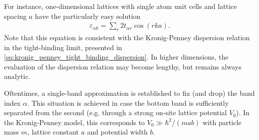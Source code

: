 For instance, one-dimensional lattices with single atom unit cells and lattice spacing $a$ have the particularly easy solution
\begin{align}
    \varepsilon_{\alpha k} = \sum_r 2t_{\alpha r}\cos(r ka).
    \label{eq:1D_tight_binding_dispersion}
\end{align}
Note that this equation is consistent with the Kronig-Penney dispersion relation in the tight-binding limit, presented in \cref{eq:kronig_penney_tight_binding_dispersion}.
In higher dimensions, the evaluation of the dispersion relation may become lengthy, but remains always analytic.

Oftentimes, a single-band approximation is established to fix (and drop) the band index $\alpha$.
This situation is achieved in case the bottom band is sufficiently separated from the second (e.g. through a strong on-site lattice potential $V_0$).
In the Kronig-Penney model, this corresponds to $V_0\gg \hbar^2/(mab)$ with particle mass $m$, lattice constant $a$ and potential width $b$.

